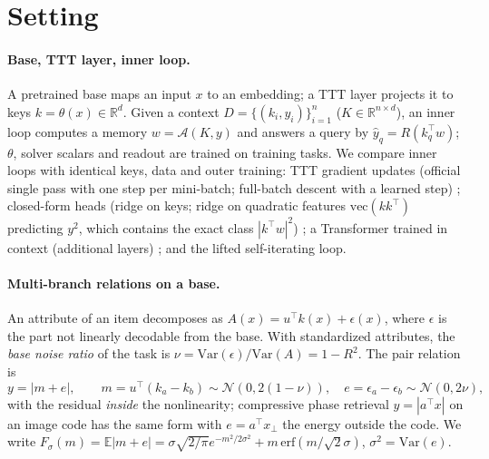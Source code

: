 \documentclass{article}
\theoremstyle{definition}
\theoremstyle{remark}
\newcommand{\Fsig}{F_{\sigma}}
\newcommand{\Ex}{\mathbb{E}}
\newcommand{\Rl}{\mathbb{R}}
\begin{document}
\section{Setting}
\label{sec:setting}

\paragraph{Base, TTT layer, inner loop.}
A pretrained base maps an input $x$ to an embedding; a TTT layer projects it to keys $k=\theta(x)\in\Rl^d$.
Given a context $D=\{(k_i,y_i)\}_{i=1}^n$ ($K\in\Rl^{n\times d}$), an inner loop computes a memory $w=\mathcal A(K,y)$ and answers a query by $\hat y_q=R(k_q^\top w)$; $\theta$, solver scalars and readout are trained on training tasks.
We compare inner loops with identical keys, data and outer training:
TTT gradient updates (official single pass with one step per mini-batch; full-batch descent with a learned step) \citep{sun2024ttt};
closed-form heads (ridge on keys; ridge on quadratic features $\mathrm{vec}(kk^\top)$ predicting $y^2$, which contains the exact class $|k^\top w|^2$) \citep{bertinetto2019r2d2,wang2026ttr};
a Transformer trained in context (additional layers) \citep{garg2022icl};
and the lifted self-iterating loop.

\paragraph{Multi-branch relations on a base.}
An attribute of an item decomposes as $A(x)=u^\top k(x)+\epsilon(x)$, where $\epsilon$ is the part not linearly decodable from the base.
With standardized attributes, the \emph{base noise ratio} of the task is $\nu=\mathrm{Var}(\epsilon)/\mathrm{Var}(A)=1-R^2$.
The pair relation is
\begin{equation}
y=|m+e|,\qquad m=u^\top(k_a-k_b)\sim\mathcal N(0,2(1-\nu)),\quad e=\epsilon_a-\epsilon_b\sim\mathcal N(0,2\nu),
\label{eq:model}
\end{equation}
with the residual \emph{inside} the nonlinearity; compressive phase retrieval $y=|a^\top x|$ on an image code has the same form with $e=a^\top x_\perp$ the energy outside the code.
We write $\Fsig(m)=\Ex|m+e|=\sigma\sqrt{2/\pi}e^{-m^2/2\sigma^2}+m\,\mathrm{erf}(m/\sqrt2\sigma)$, $\sigma^2=\mathrm{Var}(e)$.
\end{document}

